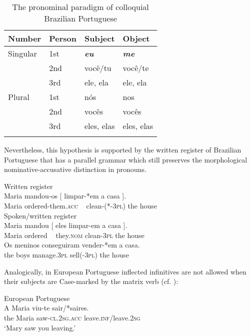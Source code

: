\documentclass[output=paper]{langsci/langscibook}
\begin{document}
\begin{table}
\caption{\label{tab:moreno:1}The pronominal paradigm of colloquial Brazilian Portuguese}
\begin{tabular}{llll}
\lsptoprule
{Number}   & Person & Subject & Object\\\midrule
{Singular} & 1st & \textbf{\textit{eu}} & \textbf{\textit{me}}\\
           & 2nd & você/tu & você/te\\
           & 3rd & ele, ela & ele, ela\\\midrule
{Plural}   & 1st & nós & nos\\
           & 2nd & vocês & vocês\\
           & 3rd & eles, elas & eles, elas\\
\lspbottomrule
\end{tabular}
\end{table}

Nevertheless, this hypothesis is supported by the written register of Brazilian Portuguese that has a parallel grammar which still preserves the morphological nominative-accusative distinction in pronouns.

\ea%
    \label{ex:moreno:24}
    \ea  Written register\\
    \gll Maria mandou-os     [  limpar-*em    a    casa ].   \\
         Maria ordered-them.\textsc{acc}   ~    clean-(*-\textsc{3pl}) the house\\
    \ex  Spoken/written register\\
    \gll Maria mandou [ eles   limpar-em a    casa ].   \\
         Maria ordered  ~  they.\textsc{nom} clean-\textsc{3pl}  the house \\
    \ex  
    \gll Os meninos conseguiram  vender-*em  a    casa. \\
         the boys      manage.\textsc{3pl}    sell(-\textsc{3pl})     the house \\
\z
\z

Analogically, in European Portuguese inflected infinitives are not allowed when their subjects are Case-marked by the matrix verb (cf. \citealt{Hornstein2008}):

\ea%
         European Portuguese\label{ex:moreno:25}\\
    \gll A   Maria viu-te           sair/*saires.\\
         the Maria saw-\textsc{cl.2sg.acc} leave.\textsc{inf}/leave.\textsc{2sg}\\
    \glt ‘Mary saw you leaving.’
\z
\end{document}
